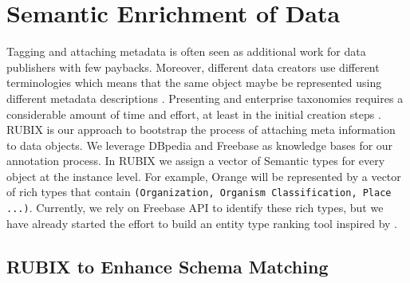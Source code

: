 \documentclass[onecolumn, crcready]{iosart2c}
\begin{document}
\section{Semantic Enrichment of Data}

Tagging and attaching metadata is often seen as additional work for data publishers with few paybacks. Moreover, different data creators use different terminologies which means that the same object maybe be represented using different metadata descriptions \cite{Furnas87thevocabulary}. Presenting and enterprise taxonomies requires a considerable amount of time and effort, at least in the initial creation steps \cite{frischmuth2012linked}.\\

RUBIX is our approach to bootstrap the process of attaching meta information to data objects. We leverage DBpedia and Freebase as knowledge bases for our annotation process. In RUBIX we assign a vector of Semantic types for every object at the instance level. For example, Orange will be represented by a vector of rich types that contain \texttt{(Organization, Organism Classification, Place ...)}. Currently, we rely on Freebase API to identify these rich types, but we have already started the effort to build an entity type ranking tool inspired by \cite{TRank}. 

\subsection{RUBIX to Enhance Schema Matching}
\end{document}
